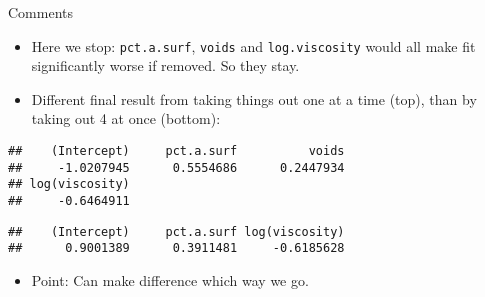 \begin{frame}[fragile]{Comments}
\protect\hypertarget{comments-2}{}
\begin{itemize}
\tightlist
\item
  Here we stop: \texttt{pct.a.surf}, \texttt{voids} and
  \texttt{log.viscosity} would all make fit significantly worse if
  removed. So they stay.
\item
  Different final result from taking things out one at a time (top),
  than by taking out 4 at once (bottom):
\end{itemize}

\begin{Shaded}
\begin{Highlighting}[]
\NormalTok{)}
\end{Highlighting}
\end{Shaded}

\begin{verbatim}
##    (Intercept)     pct.a.surf          voids 
##     -1.0207945      0.5554686      0.2447934 
## log(viscosity) 
##     -0.6464911
\end{verbatim}

\begin{Shaded}
\begin{Highlighting}[]
\NormalTok{)}
\end{Highlighting}
\end{Shaded}

\begin{verbatim}
##    (Intercept)     pct.a.surf log(viscosity) 
##      0.9001389      0.3911481     -0.6185628
\end{verbatim}

\begin{itemize}
\tightlist
\item
  Point: Can make difference which way we go.
\end{itemize}
\end{frame}

